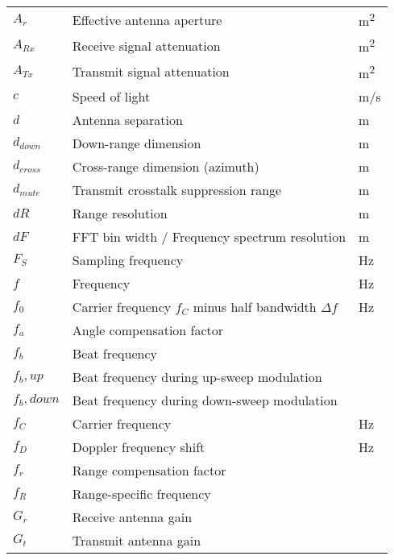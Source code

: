 \begin{listofsymbols}

\keepXColumns
\setlength{\tabcolsep}{0pt}
\begin{tabularx}{\textwidth}{%
  >{\setlength{\hsize}{3cm}\raggedright\arraybackslash}X%
  X%
  >{\setlength{\hsize}{2cm}\raggedright\arraybackslash}X%
}

$A_r$ & Effective antenna aperture          & \si{m^2}\\
$A_{Rx}$ & Receive signal attenuation       & \si{m^2}\\
$A_{Tx}$ & Transmit signal attenuation      & \si{m^2}\\
$c$  & Speed of light                       & \si{m/s}\\
$d$  & Antenna separation                   & \si{m}  \\
$d_{down}$ & Down-range dimension           & \si{m} \\
$d_{cross}$ & Cross-range dimension (azimuth) & \si{m} \\
$d_{mute}$ & Transmit crosstalk suppression range & \si{m} \\
$dR$  & Range resolution                    & \si{m} \\
$dF$  & FFT bin width / Frequency spectrum resolution & \si{m} \\
$F_S$ &  Sampling frequency                 & \si{Hz}\\
$f$   &  Frequency                          & \si{Hz}\\
$f_0$ & Carrier frequency $f_C$ minus half bandwidth $\Delta f$& \si{Hz}\\
$f_a$ & Angle compensation factor           & \\
$f_b$ & Beat frequency                      & \\
$f_b,up$ & Beat frequency during up-sweep modulation & \\
$f_b,down$ & Beat frequency during down-sweep modulation & \\
$f_C$ & Carrier frequency                   & \si{Hz}\\
$f_D$ & Doppler frequency shift             & \si{Hz}\\
$f_r$ & Range compensation factor           & \\
$f_R$ & Range-specific frequency            & \\
$G_r$ & Receive antenna gain                & \\
$G_t$ & Transmit antenna gain               & \\

\end{tabularx}
\end{listofsymbols}
